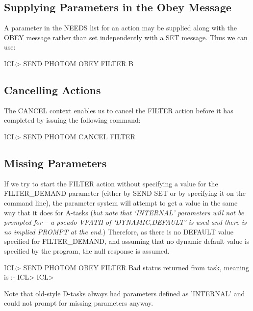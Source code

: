 \documentclass[twoside,11pt,nolof,chapters]{starlink}
\begin{document}
\subsection{Supplying Parameters in the Obey Message}

A parameter in the NEEDS list for an action may be supplied along with the
OBEY message rather than set independently with a SET message. Thus we
can use:

\begin{terminalv}
    ICL> SEND PHOTOM OBEY FILTER B
\end{terminalv}

\subsection{Cancelling Actions}

The CANCEL context enables us to cancel the FILTER action before it has
completed by issuing the following command:

\begin{terminalv}
    ICL> SEND PHOTOM CANCEL FILTER
\end{terminalv}

\subsection{Missing Parameters}

If we try to start the FILTER action without specifying a value for the
FILTER\_DEMAND parameter (either by SEND SET or by specifying it on the
command line), the parameter system will attempt to get a value in the
same way that it does for A-tasks (\emph{but note that `INTERNAL' parameters
will not be prompted for -- a pseudo VPATH of `DYNAMIC,DEFAULT' is used and
there is no implied PROMPT at the end.})
Therefore, as there is no DEFAULT value specified for FILTER\_DEMAND, and
assuming that no dynamic default value is specified by the program, the
null response is assumed.

\begin{terminalv}
    ICL> SEND PHOTOM OBEY FILTER
    Bad status returned from task, meaning is :-
    ICL>
    ICL>
\end{terminalv}

Note that old-style D-tasks always had parameters defined as 'INTERNAL'
and could not prompt for missing parameters anyway.
\end{document}
